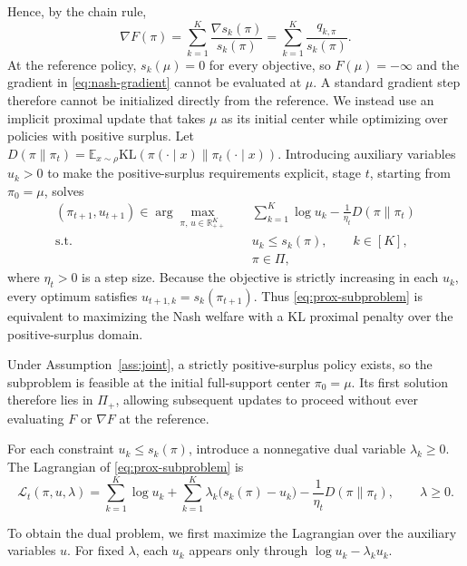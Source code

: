 \documentclass{article}
\theoremstyle{remark}
\theoremstyle{plain}
\newcommand{\KL}{\mathrm{KL}}
\newcommand{\E}{\mathbb{E}}
\newcommand{\R}{\mathbb{R}}
\begin{document}
Hence, by the chain rule,
\begin{equation}
\nabla F(\pi)
=
\sum_{k=1}^K
\frac{\nabla s_k(\pi)}{s_k(\pi)}
=
\sum_{k=1}^K
\frac{q_{k,\pi}}{s_k(\pi)}.
\label{eq:nash-gradient}
\end{equation}
At the reference policy, $s_k(\mu)=0$ for every objective, so $F(\mu)=-\infty$ and the gradient in \eqref{eq:nash-gradient} cannot be evaluated at $\mu$. A standard gradient step therefore cannot be initialized directly from the reference. We instead use an implicit proximal update that takes $\mu$ as its initial center while optimizing over policies with positive surplus. Let
$D(\pi\|\pi_t)=\E_{x\sim\rho}\KL(\pi(\cdot\mid x)\|\pi_t(\cdot\mid x))$.
Introducing auxiliary variables $u_k>0$ to make the positive-surplus requirements explicit, stage $t$, starting from $\pi_0=\mu$, solves
\begin{equation}
\begin{aligned}
(\pi_{t+1},u_{t+1})\in
\arg\max_{\pi,\,u\in\R_{++}^K}
\quad&\sum_{k=1}^K\log u_k-
\frac{1}{\eta_t}D(\pi\|\pi_t)\\
\text{s.t.}\quad&u_k\le s_k(\pi),\qquad k\in[K],\\
&\pi\in\Pi,
\end{aligned}
\label{eq:prox-subproblem}
\end{equation}
where $\eta_t>0$ is a step size. Because the objective is strictly increasing in each $u_k$, every optimum satisfies
$u_{t+1,k}=s_k(\pi_{t+1})$. Thus \eqref{eq:prox-subproblem} is equivalent to maximizing the Nash welfare with a KL proximal penalty over the positive-surplus domain.

Under Assumption~\ref{ass:joint}, a strictly positive-surplus policy exists, so the subproblem is feasible at the initial full-support center $\pi_0=\mu$. Its first solution therefore lies in $\Pi_+$, allowing subsequent updates to proceed without ever evaluating $F$ or $\nabla F$ at the reference.

For each constraint $u_k\le s_k(\pi)$, introduce a nonnegative dual variable $\lambda_k\ge0$. The Lagrangian of \eqref{eq:prox-subproblem} is
\begin{equation}
\mathcal L_t(\pi,u,\lambda)
=
\sum_{k=1}^K \log u_k
+
\sum_{k=1}^K \lambda_k\bigl(s_k(\pi)-u_k\bigr)
-
\frac{1}{\eta_t}D(\pi\|\pi_t),
\qquad
\lambda\ge0.
\label{eq:prox-lagrangian}
\end{equation}

To obtain the dual problem, we first maximize the Lagrangian over the auxiliary variables $u$. For fixed $\lambda$, each $u_k$ appears only through $\log u_k-\lambda_k u_k$.
\end{document}

